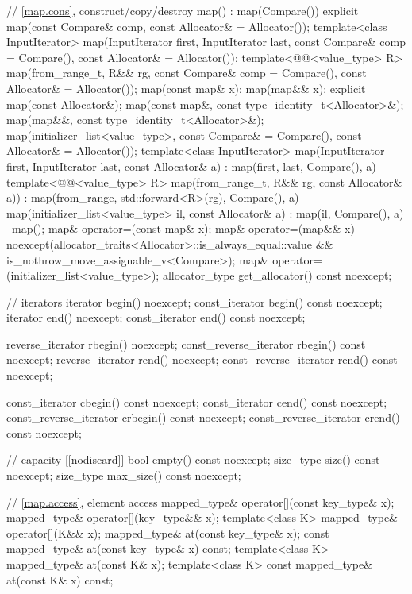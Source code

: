 \begin{codeblock}
{{    // \ref{map.cons}, construct/copy/destroy
    map() : map(Compare()) { }
    explicit map(const Compare& comp, const Allocator& = Allocator());
    template<class InputIterator>
      map(InputIterator first, InputIterator last,
          const Compare& comp = Compare(), const Allocator& = Allocator());
    template<@@<value_type> R>
      map(from_range_t, R&& rg, const Compare& comp = Compare(), const Allocator& = Allocator());
    map(const map& x);
    map(map&& x);
    explicit map(const Allocator&);
    map(const map&, const type_identity_t<Allocator>&);
    map(map&&, const type_identity_t<Allocator>&);
    map(initializer_list<value_type>,
      const Compare& = Compare(),
      const Allocator& = Allocator());
    template<class InputIterator>
      map(InputIterator first, InputIterator last, const Allocator& a)
        : map(first, last, Compare(), a) { }
    template<@@<value_type> R>
      map(from_range_t, R&& rg, const Allocator& a))
        : map(from_range, std::forward<R>(rg), Compare(), a) { }
    map(initializer_list<value_type> il, const Allocator& a)
      : map(il, Compare(), a) { }
    ~map();
    map& operator=(const map& x);
    map& operator=(map&& x)
      noexcept(allocator_traits<Allocator>::is_always_equal::value &&
               is_nothrow_move_assignable_v<Compare>);
    map& operator=(initializer_list<value_type>);
    allocator_type get_allocator() const noexcept;

    // iterators
    iterator               begin() noexcept;
    const_iterator         begin() const noexcept;
    iterator               end() noexcept;
    const_iterator         end() const noexcept;

    reverse_iterator       rbegin() noexcept;
    const_reverse_iterator rbegin() const noexcept;
    reverse_iterator       rend() noexcept;
    const_reverse_iterator rend() const noexcept;

    const_iterator         cbegin() const noexcept;
    const_iterator         cend() const noexcept;
    const_reverse_iterator crbegin() const noexcept;
    const_reverse_iterator crend() const noexcept;

    // capacity
    [[nodiscard]] bool empty() const noexcept;
    size_type size() const noexcept;
    size_type max_size() const noexcept;

    // \ref{map.access}, element access
    mapped_type& operator[](const key_type& x);
    mapped_type& operator[](key_type&& x);
    template<class K> mapped_type& operator[](K&& x);
    mapped_type&       at(const key_type& x);
    const mapped_type& at(const key_type& x) const;
    template<class K> mapped_type&       at(const K& x);
    template<class K> const mapped_type& at(const K& x) const;

}}
\end{codeblock}
